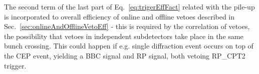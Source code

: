 The second term of the last part of Eq.~\eqref{eq:trigerEffFact} related with the pile-up is incorporated to overall efficiency of online and offline vetoes described in Sec.~\ref{sec:onlineAndOfflineVetoEff} - this is required by the correlation of vetoes, the possibility that vetoes in independent subdetectors take place in the same bunch crossing. This could happen if e.g. single diffraction event occurs on top of the CEP event, yielding a BBC signal and RP signal, both vetoing RP\_CPT2 trigger.




